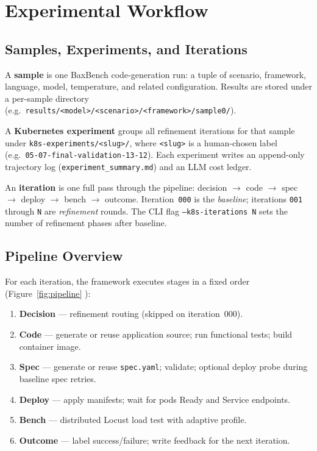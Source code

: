 \section{Experimental Workflow}
\label{sec:methods-workflow}

\subsection{Samples, Experiments, and Iterations}

A \textbf{sample} is one BaxBench code-generation run: a tuple of scenario,
framework, language, model, temperature, and related configuration.  Results
are stored under a per-sample directory (e.g.\
\texttt{results/<model>/<scenario>/<framework>/sample0/}).

A \textbf{Kubernetes experiment} groups all refinement iterations for that
sample under \texttt{k8s-experiments/<slug>/}, where \texttt{<slug>} is a
human-chosen label (e.g.\ \texttt{05-07-final-validation-13-12}).  Each
experiment writes an append-only trajectory log
(\texttt{experiment\_summary.md}) and an LLM cost ledger.

An \textbf{iteration} is one full pass through the pipeline:
decision $\to$ code $\to$ spec $\to$ deploy $\to$ bench $\to$ outcome.
Iteration~\texttt{000} is the \emph{baseline}; iterations \texttt{001} through
\texttt{N} are \emph{refinement} rounds.  The CLI flag \texttt{--k8s-iterations
N} sets the number of refinement phases after baseline.

\subsection{Pipeline Overview}

For each iteration, the framework executes stages in a fixed order
(Figure~\ref{fig:pipeline}
):

\begin{enumerate}
  \item \textbf{Decision} --- refinement routing (skipped on iteration~000).
  \item \textbf{Code} --- generate or reuse application source; run functional
        tests; build container image.
  \item \textbf{Spec} --- generate or reuse \texttt{spec.yaml}; validate;
        optional deploy probe during baseline spec retries.
  \item \textbf{Deploy} --- apply manifests; wait for pods Ready and Service
        endpoints.
  \item \textbf{Bench} --- distributed Locust load test with adaptive profile.
  \item \textbf{Outcome} --- label success/failure; write feedback for the next
        iteration.
\end{enumerate}

